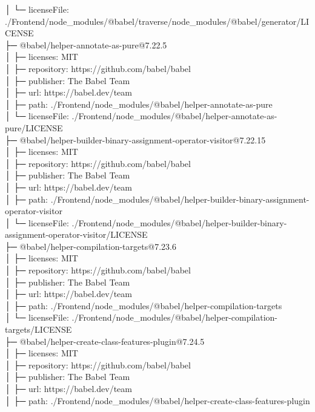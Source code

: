 \documentclass[
    paper=a4,
    twoside=false,
    parskip=half,
    listof=entryprefix,
    listof=totoc,
    index=totoc,
    bibliography=totoc,
    headsepline,
]{scrbook}
\begin{document}
    │  └─ licenseFile: ./Frontend/node\_modules/@babel/traverse/node\_modules/@babel/generator/LICENSE\\
    ├─ @babel/helper-annotate-as-pure@7.22.5\\
    │  ├─ licenses: MIT\\
    │  ├─ repository: https://github.com/babel/babel\\
    │  ├─ publisher: The Babel Team\\
    │  ├─ url: https://babel.dev/team\\
    │  ├─ path: ./Frontend/node\_modules/@babel/helper-annotate-as-pure\\
    │  └─ licenseFile: ./Frontend/node\_modules/@babel/helper-annotate-as-pure/LICENSE\\
    ├─ @babel/helper-builder-binary-assignment-operator-visitor@7.22.15\\
    │  ├─ licenses: MIT\\
    │  ├─ repository: https://github.com/babel/babel\\
    │  ├─ publisher: The Babel Team\\
    │  ├─ url: https://babel.dev/team\\
    │  ├─ path: ./Frontend/node\_modules/@babel/helper-builder-binary-assignment-operator-visitor\\
    │  └─ licenseFile: ./Frontend/node\_modules/@babel/helper-builder-binary-assignment-operator-visitor/LICENSE\\
    ├─ @babel/helper-compilation-targets@7.23.6\\
    │  ├─ licenses: MIT\\
    │  ├─ repository: https://github.com/babel/babel\\
    │  ├─ publisher: The Babel Team\\
    │  ├─ url: https://babel.dev/team\\
    │  ├─ path: ./Frontend/node\_modules/@babel/helper-compilation-targets\\
    │  └─ licenseFile: ./Frontend/node\_modules/@babel/helper-compilation-targets/LICENSE\\
    ├─ @babel/helper-create-class-features-plugin@7.24.5\\
    │  ├─ licenses: MIT\\
    │  ├─ repository: https://github.com/babel/babel\\
    │  ├─ publisher: The Babel Team\\
    │  ├─ url: https://babel.dev/team\\
    │  ├─ path: ./Frontend/node\_modules/@babel/helper-create-class-features-plugin\\
\end{document}

